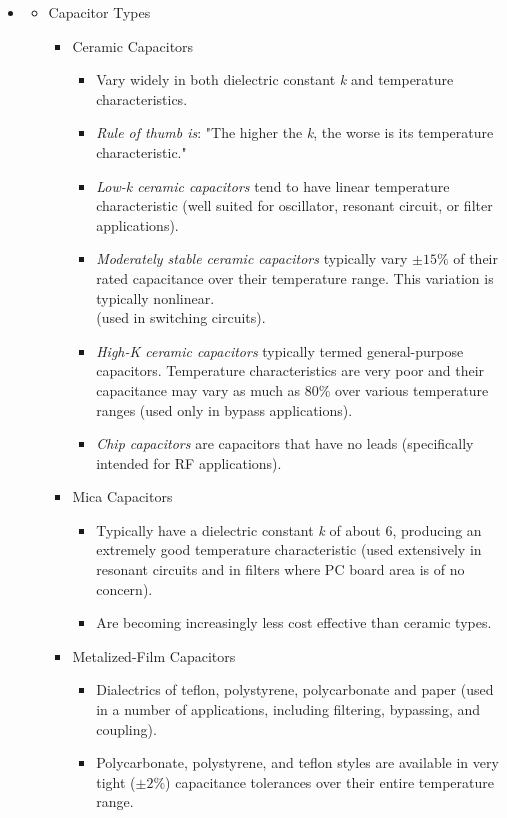 \begin{itemize}
	\item[] 
	\begin{itemize}
		\item Capacitor Types
		\begin{itemize}
			\item Ceramic Capacitors
			\begin{itemize}
				\item Vary widely in both dielectric constant \textit{k} and temperature characteristics.
				\item \textit{Rule of thumb is}: "The higher the \textit{k}, the worse is its temperature characteristic."
				\item \textit{Low-k ceramic capacitors} tend to have linear
				temperature characteristic (well suited for
				oscillator, resonant circuit, or filter applications).
				\item \textit{Moderately stable ceramic capacitors} typically vary $\pm15\%$ of their rated capacitance over their temperature range. This variation is typically nonlinear.\\ (used in switching circuits).
				\item \textit{High-K ceramic capacitors} typically termed general-purpose	capacitors. Temperature characteristics are very poor and their capacitance may vary as much as 80\% over various temperature	ranges (used only in bypass applications).
				\item \textit{Chip capacitors} are capacitors that have no leads (specifically intended for RF applications).
			\end{itemize}
			\item Mica Capacitors
			\begin{itemize}
				\item Typically have a dielectric constant \textit{k} of about 6, producing an extremely good temperature characteristic (used extensively in resonant circuits and in filters where PC board area is of no concern).
				\item Are becoming	increasingly less cost effective than ceramic types.
			\end{itemize}
			\item Metalized-Film Capacitors
			\begin{itemize}
				\item Dialectrics of teflon, polystyrene, polycarbonate and paper (used in a number of applications,	including filtering, bypassing, and coupling). 
				\item Polycarbonate, polystyrene, and teflon styles are available in very tight ($\pm2\%$) capacitance tolerances over their entire temperature range.

\end{itemize}
\end{itemize}
\end{itemize}
\end{itemize}
